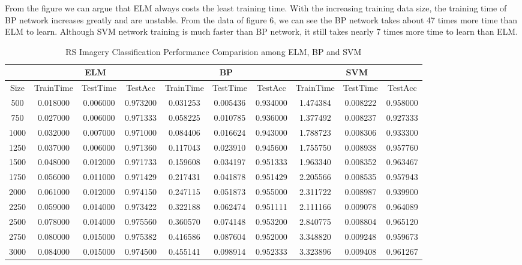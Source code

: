 \documentclass{elsart}
\begin{document}
From the figure we can argue that ELM always costs the least training time.
With the increasing training data size, the training time of BP network increases greatly and are unstable.
From the data of figure 6, we can see the BP network takes about 47 times more time than ELM to learn. 
Although SVM network training is much faster than BP network, it still takes nearly 7 times more time to learn than ELM.
\par

\begin{table}[h]
\scriptsize{
\begin{center}
\begin{tabular}[bt]{|c||c|c|c||c|c|c||c|c|c|}\hline

 & \multicolumn{3}{|c||}{ELM} & \multicolumn{3}{|c||}{BP} & \multicolumn{3}{|c|}{SVM} \\ \hline
Size &TrainTime &TestTime &TestAcc &TrainTime &TestTime &TestAcc &TrainTime &TestTime &TestAcc \\ \hline
500 &0.018000 &0.006000 &0.973200 &0.031253 &0.005436 &0.934000 &1.474384 &0.008222 &0.958000 \\ \hline
750 &0.027000 &0.006000 &0.971333 &0.058225 &0.010785 &0.936000 &1.377492 &0.008237 &0.927333 \\ \hline
1000 &0.032000 &0.007000 &0.971000 &0.084406 &0.016624 &0.943000 &1.788723 &0.008306 &0.933300 \\ \hline
1250 &0.037000 &0.006000 &0.971360 &0.117043 &0.023910 &0.945600 &1.755750 &0.008938 &0.957760 \\ \hline
1500 &0.048000 &0.012000 &0.971733 &0.159608 &0.034197 &0.951333 &1.963340 &0.008352 &0.963467 \\ \hline
1750 &0.056000 &0.011000 &0.971429 &0.217431 &0.041878 &0.951429 &2.205566 &0.008535 &0.957943 \\ \hline
2000 &0.061000 &0.012000 &0.974150 &0.247115 &0.051873 &0.955000 &2.311722 &0.008987 &0.939900 \\ \hline
2250 &0.059000 &0.014000 &0.973422 &0.322188 &0.062474 &0.951111 &2.111166 &0.009078 &0.964089 \\ \hline
2500 &0.078000 &0.014000 &0.975560 &0.360570 &0.074148 &0.953200 &2.840775 &0.008804 &0.965120 \\ \hline
2750 &0.080000 &0.015000 &0.975382 &0.416586 &0.087604 &0.952000 &3.348820 &0.009248 &0.959673 \\ \hline
3000 &0.084000 &0.015000 &0.974500 &0.455141 &0.098914 &0.952333 &3.323896 &0.009408 &0.961267 \\ \hline
\end{tabular}
\caption{RS Imagery Classification Performance Comparision among ELM, BP and SVM}
\label{specification}
\end{center}
}
\end{table}
\end{document}
